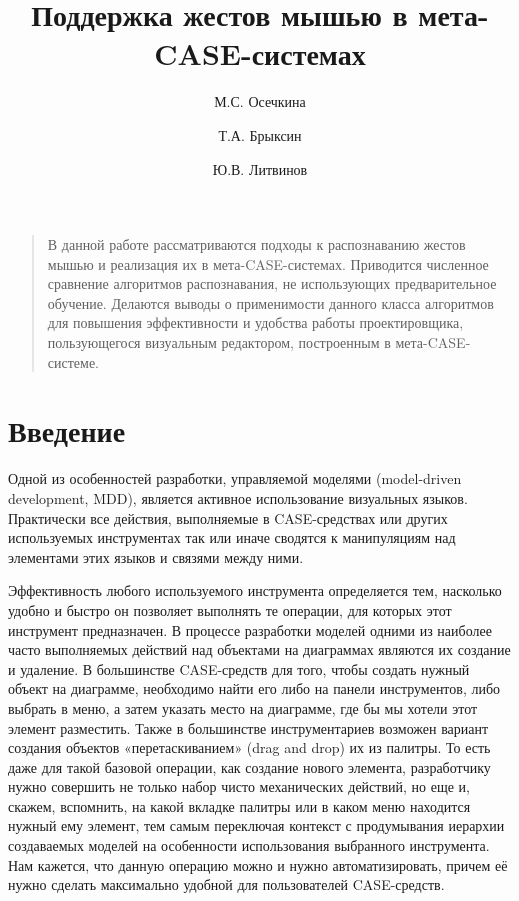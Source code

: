 \documentclass[a5paper]{article}
\title{Поддержка жестов мышью в мета-CASE-системах}
\author{М.С. Осечкина \and Т.А. Брыксин \and Ю.В. Литвинов}
\date{}
\begin{document}
\maketitle
\thispagestyle{empty}

\begin{quote}
\small\noindent
В данной работе рассматриваются подходы к распознаванию жестов мышью и реализация их в мета-CASE-системах. Приводится численное сравнение алгоритмов распознавания, не использующих предварительное обучение. Делаются выводы о применимости данного класса алгоритмов для повышения эффективности и удобства работы проектировщика, пользующегося визуальным редактором, построенным в мета-CASE-системе.
\end{quote}

\section*{Введение}
Одной из особенностей разработки, управляемой моделями (model-driven development, MDD), является активное использование визуальных языков. Практически все действия, выполняемые в CASE-средствах или других используемых инструментах так или иначе сводятся к манипуляциям над элементами этих языков и связями между ними. 

Эффективность любого используемого инструмента определяется тем, насколько удобно и быстро он позволяет выполнять те операции, для которых этот инструмент предназначен. В процессе разработки моделей одними из наиболее часто выполняемых действий над объектами на диаграммах являются их создание и удаление.  В большинстве CASE-средств для того, чтобы создать нужный объект на диаграмме, необходимо найти его либо на панели инструментов, либо выбрать в меню, а затем указать место на диаграмме, где бы мы хотели этот элемент разместить. Также в большинстве инструментариев возможен вариант создания объектов «перетаскиванием» (drag and drop) их из палитры. То есть даже для такой базовой операции, как создание нового элемента, разработчику нужно совершить не только набор чисто механических действий, но еще и, скажем, вспомнить, на какой вкладке палитры или в каком меню находится нужный ему элемент, тем самым переключая контекст с продумывания иерархии создаваемых моделей на особенности использования выбранного инструмента. Нам кажется, что данную операцию можно и нужно автоматизировать, причем её нужно сделать максимально удобной для пользователей CASE-средств. 
\end{document}

